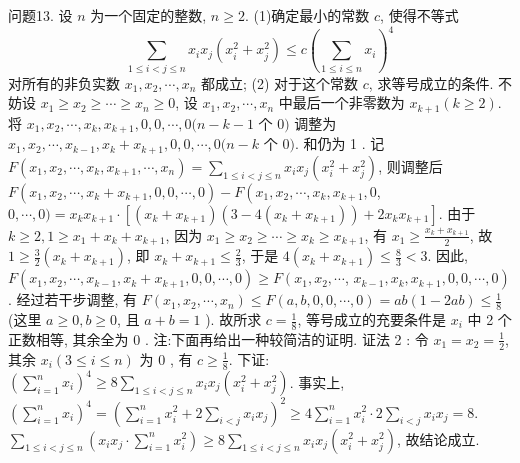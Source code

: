 问题13. 设 $n$ 为一个固定的整数, $n \geqslant 2$.
(1)确定最小的常数 $c$, 使得不等式
$$
\sum_{1 \leqslant i<j \leqslant n} x_i x_j\left(x_i^2+x_j^2\right) \leqslant c\left(\sum_{1 \leqslant i \leqslant n} x_i\right)^4
$$
对所有的非负实数 $x_1, x_2, \cdots, x_n$ 都成立;
(2) 对于这个常数 $c$, 求等号成立的条件.
不妨设 $x_1 \geqslant x_2 \geqslant \cdots \geqslant x_n \geqslant 0$, 设 $x_1, x_2, \cdots, x_n$ 中最后一个非零数为 $x_{k+1}(k \geqslant 2)$. 将 $x_1, x_2, \cdots, x_k, x_{k+1}, 0,0, \cdots, 0(n-k-1$ 个 0$)$ 调整为 $x_1, x_2, \cdots, x_{k-1}, x_k+x_{k+1}, 0,0, \cdots, 0(n-k$ 个 0$)$. 和仍为 1 .
记 $F\left(x_1, x_2, \cdots, x_k, x_{k+1}, \cdots, x_n\right)=\sum_{1 \leqslant i<j \leqslant n} x_i x_j\left(x_i^2+x_j^2\right)$, 则调整后 $F\left(x_1, x_2, \cdots, x_k+x_{k+1}, 0,0, \cdots, 0\right)-F\left(x_1, x_2, \cdots, x_k, x_{k+1}, 0\right.$, $0, \cdots, 0)=x_k x_{k+1} \cdot\left[\left(x_k+x_{k+1}\right)\left(3-4\left(x_k+x_{k+1}\right)\right)+2 x_k x_{k+1}\right]$.
由于 $k \geqslant 2,1 \geqslant x_1+x_k+x_{k+1}$, 因为 $x_1 \geqslant x_2 \geqslant \cdots \geqslant x_k \geqslant x_{k+1}$, 有 $x_1 \geqslant \frac{x_k+x_{k+1}}{2}$, 故 $1 \geqslant \frac{3}{2}\left(x_k+x_{k+1}\right)$, 即 $x_k+x_{k+1} \leqslant \frac{2}{3}$, 于是 $4\left(x_k+x_{k+1}\right) \leqslant \frac{8}{3}<3$.
因此, $F\left(x_1, x_2, \cdots, x_{k-1}, x_k+x_{k+1}, 0,0, \cdots, 0\right) \geqslant F\left(x_1, x_2, \cdots\right.$, $\left.x_{k-1}, x_k, x_{k+1}, 0,0, \cdots, 0\right)$.
经过若干步调整, 有 $F\left(x_1, x_2, \cdots, x_n\right) \leqslant F(a, b, 0,0, \cdots, 0)= a b(1-2 a b) \leqslant \frac{1}{8}$ (这里 $a \geqslant 0, b \geqslant 0$, 且 $a+b=1$ ).
故所求 $c=\frac{1}{8}$, 等号成立的充要条件是 $x_i$ 中 2 个正数相等, 其余全为 0 . 注:下面再给出一种较简洁的证明.
证法 2 : 令 $x_1=x_2=\frac{1}{2}$, 其余 $x_i(3 \leqslant i \leqslant n)$ 为 0 , 有 $c \geqslant \frac{1}{8}$.
下证: $\left(\sum_{i=1}^n x_i\right)^4 \geqslant 8 \sum_{1 \leqslant i<j \leqslant n} x_i x_j\left(x_i^2+x_j^2\right)$.
事实上, $\left(\sum_{i=1}^n x_i\right)^4=\left(\sum_{i=1}^n x_i^2+2 \sum_{i<j} x_i x_j\right)^2 \geqslant 4 \sum_{i=1}^n x_i^2 \cdot 2 \sum_{i<j} x_i x_j=8$.
$\sum_{1 \leqslant i<j \leqslant n}\left(x_i x_j \cdot \sum_{i=1}^n x_i^2\right) \geqslant 8 \sum_{1 \leqslant i<j \leqslant n} x_i x_j\left(x_i^2+x_j^2\right)$, 故结论成立.



